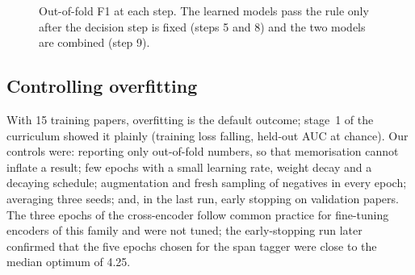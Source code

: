 \begin{figure}[h]
\centering
{}
\caption{Out-of-fold F1 at each step. The learned models pass the rule only after the decision step is fixed
(steps 5 and 8) and the two models are combined (step 9).}
\label{fig:progress}
\end{figure}

\subsection{Controlling overfitting}
With 15 training papers, overfitting is the default outcome; stage~1 of the curriculum showed it plainly
(training loss falling, held-out AUC at chance). Our controls were: reporting only out-of-fold numbers, so
that memorisation cannot inflate a result; few epochs with a small learning rate, weight decay and a decaying
schedule; augmentation and fresh sampling of negatives in every epoch; averaging three seeds; and, in the last
run, early stopping on validation papers. The three epochs of the cross-encoder follow common practice for
fine-tuning encoders of this family \citep{devlin2019bert} and were not tuned; the early-stopping run later
confirmed that the five epochs chosen for the span tagger were close to the median optimum of 4.25.
